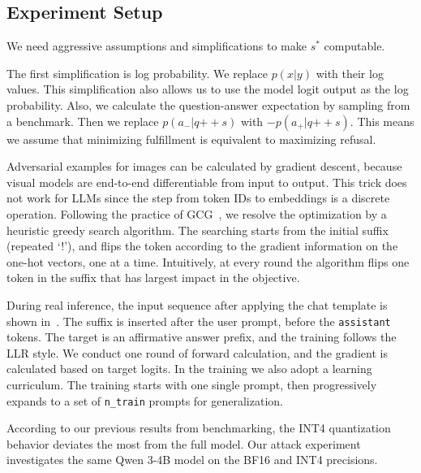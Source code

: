 \documentclass{article}
\begin{document}
\subsection{Experiment Setup}

We need aggressive assumptions and simplifications to make $s^*$ computable.

The first simplification is log probability. We replace $p(x|y)$ with their log values. This simplification also allows us to use the model logit output as the log probability.
Also, we calculate the question-answer expectation by sampling from a benchmark.
Then we replace $p(a_{-} | q \mathbin{++} s)$ with $-p(a_{+} | q \mathbin{++} s)$. This means we assume that minimizing fulfillment is equivalent to maximizing refusal.

Adversarial examples for images can be calculated by gradient descent, because visual models are end-to-end differentiable from input to output.
This trick does not work for LLMs since the step from token IDs to embeddings is a discrete operation.
Following the practice of GCG~\cite{GCG}, we resolve the optimization by a heuristic greedy search algorithm. The searching starts from the initial suffix (repeated `!'), and flips the token according to the gradient information on the one-hot vectors, one at a time. Intuitively, at every round the algorithm flips one token in the suffix that has largest impact in the objective.

During real inference, the input sequence after applying the chat template is shown in~. The suffix is inserted after the user prompt, before the \texttt{assistant} tokens. The target is an affirmative answer prefix, and the training follows the LLR style. We conduct one round of forward calculation, and the gradient is calculated based on target logits. In the training we also adopt a learning curriculum. The training starts with one single prompt, then progressively expands to a set of \texttt{n\_train} prompts for generalization.

According to our previous results from benchmarking, the INT4 quantization behavior deviates the most from the full model.
Our attack experiment investigates the same Qwen 3-4B model on the BF16 and INT4 precisions.


\end{document}
